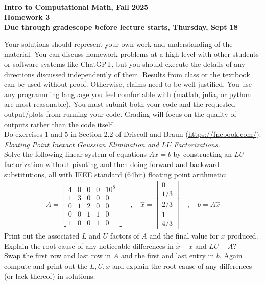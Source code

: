 \documentclass[11pt]{article}
\begin{document}
\begin{center}
{\bf Intro to Computational Math, Fall 2025\\
Homework 3\\
Due through gradescope before lecture starts, Thursday, Sept 18}
\end{center}

Your solutions should represent your own work and understanding of the material. You can discuss homework problems at a high level with other students or software systems like ChatGPT, but you should execute the details of any directions discussed independently of them. Results from class or the textbook can be used without proof. Otherwise, claims need to be well justified. You use any programming language you feel comfortable with (matlab, julia, or python are most reasonable). You must submit both your code and the requested output/plots from running your code. Grading will focus on the quality of outputs rather than the code itself.\\


 Do exercises 1 and 5 in Section 2.2 of Driscoll and Braun (\url{https://fncbook.com/}).\\

 {\it Floating Point Inexact Gaussian Elimination and LU Factorizations.}\\
Solve the following linear system of equations $Ax=b$ by constructing an $LU$ factorization without pivoting and then doing forward and backward substitutions, all with IEEE standard (64bit) floating point arithmetic:
\begin{align*}
    A = \begin{bmatrix}
        4 & 0 & 0 & 0 & 10^{8} \\
        1 & 3 & 0 & 0 & 0 \\
        0 & 1 & 2 & 0 & 0 \\
        0 & 0 & 1 & 1 & 0 \\
        1 & 0 & 0 & 1 & 0 
    \end{bmatrix}\quad , \quad \hat x = \begin{bmatrix} 0 \\ 1/3 \\ 2/3 \\ 1 \\ 4/3\end{bmatrix} \quad , \quad b = A\hat x
\end{align*}
Print out the associated $L$ and $U$ factors of $A$ and the final value for $x$ produced. Explain the root cause of any noticeable differences in $\hat x - x$ and $LU-A$?\\[6pt]
Swap the first row and last row in $A$ and the first and last entry in $b$. Again compute and print out the $L,U,x$ and explain the root cause of any differences (or lack thereof) in solutions.
\end{document}
